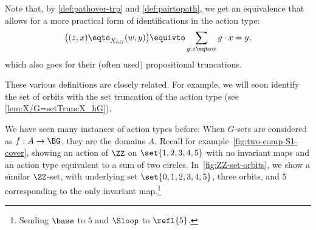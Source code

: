 \begin{remark}\label{rem:path-in-action-type}
  Note that, by \cref{def:pathover-trp} and \cref{def:pairtopath}, we get an
  equivalence that allows for a more practical form of identifications in the
  action type:
  \[
    \bigl((z,x)\eqto_{X_{hG}}(w,y)\bigr) \equivto
    \sum_{g:z\eqto w} g\cdot x = y,
  \]
  which also goes for their (often used) propositional truncations.
\end{remark}

These various definitions are closely related. For example, we will soon
identify the set of orbits with the set truncation of the action type (see
\cref{lem:X/G=setTruncX_hG}).

We have seen many instances of action types before:
When $G$-sets are considered as \coverings $f : A \to \BG$,
they are the domains $A$.
Recall for example~\cref{fig:two-comp-S1-cover},
showing an action of $\ZZ$ on $\set{1,2,3,4,5}$ with no invariant maps
and an action type equivalent to a sum of two circles.
In~\cref{fig:ZZ-set-orbits}, we show a similar $\ZZ$-set,
with underlying set $\set{0,1,2,3,4,5}$, three orbits,
and $5$ corresponding to the only invariant map.\footnote{%
Sending $\base$ to $5$ and $\Sloop$ to $\refl{5}$.}

